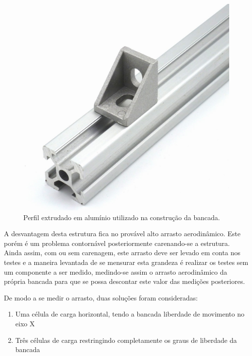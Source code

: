 \begin{figure}[!ht]
    \centering
    \includegraphics[width=.8\linewidth]{figuras/internet/perfil_aluminio.jpg}
    \caption{Perfil extrudado em alumínio utilizado na construção da bancada\cite{autor}.}
    \label{fig:perfil_aluminio}
\end{figure}

A desvantagem desta estrutura fica no provável alto arrasto aerodinâmico. Este porém é um problema contornável posteriormente carenando-se a estrutura. Ainda assim, com ou sem carenagem, este arrasto deve ser levado em conta nos testes e a maneira levantada de se mensurar esta grandeza é realizar os testes sem um componente a ser medido, medindo-se assim o arrasto aerodinâmico da própria bancada para que se possa descontar este valor das medições posteriores.

De modo a se medir o arrasto, duas soluções foram consideradas: 

\begin{enumerate}
    \item Uma célula de carga horizontal, tendo a bancada liberdade de movimento no eixo X
    \item Três células de carga restringindo completamente os graus de liberdade da bancada
\end{enumerate}

